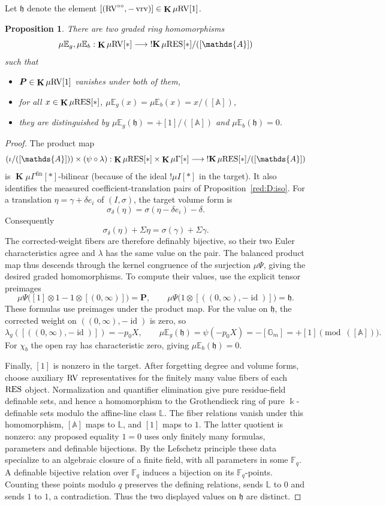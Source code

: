 \documentclass[12pt]{amsart}
\theoremstyle{plain}
\newtheorem{prop}[thm]{Proposition}
\theoremstyle{definition}
\theoremstyle{remark}
\numberwithin{equation}{section}
\theoremstyle{plain}
\newcommand{\RV}{\textup{RV}}
\DeclareMathOperator{\id}{id}
\DeclareMathOperator{\K}{\mathds{k}}
\newcommand{\A}{\mathds{A}}
\newcommand{\G}{\mathds{G}}
\newcommand{\gh}{\mathfrak{h}}
\newcommand{\0}{\emptyset}
\newcommand{\bb}[1]{\mathbb{#1}}
\newcommand{\fun}{\longrightarrow}
\newcommand{\mgRV}{{\mu}{\RV}}
\newcommand{\mG}{{\mu}{\Gamma}}
\newcommand{\RES}{\textup{RES}}
\newcommand{\mgRES}{{\mu}{\RES}}
\newcommand{\mgE}{{\mu}{\bb E}}
\DeclareMathOperator{\ggk}{\mathbf{K}}
\DeclareMathOperator{\sggk}{!\mathbf{K}}
\DeclareMathOperator{\fin}{fin}
\DeclareMathOperator{\vrv}{vrv}
\newcommand{\ccirc}{\circ \circ}
\begin{document}
Let $\gh$ denote the element $[(\RV^{\ccirc},  -\vrv)] \in \ggk \mgRV[1]$.

\begin{prop}\label{prop:eu:retr:k}
There are two graded ring homomorphisms
\[
  \mgE_{g}, \mgE_{b}: \ggk \mgRV[*] \fun   \sggk \mgRES[*] / ([\A])
\]
such that
\begin{itemize}
  \item $\bm P \in \ggk \mgRV[1]$ vanishes under both of them,
  \item for all $x \in \ggk \mgRES[*]$, $\mgE_{g}(x) = \mgE_{b}(x) = x/([\A])$,
  \item they are distinguished by $\mgE_{g}(\gh) = +[1]/([\A])$ and $\mgE_{b}(\gh) = 0$.
\end{itemize}
\end{prop}
\begin{proof}
The product map
\[
(\iota /([\A])) \times (\psi \circ \lambda) : \ggk \mgRES[*] \times  \ggk \mG[*] \fun    \sggk \mgRES[*] /([\A])
\]
is $\ggk \mG^{\fin}[*]$-bilinear (because of the ideal $!\mu I[*]$ in the target).
It also identifies the measured coefficient-translation pairs of Proposition~\ref{red:D:iso}. For a translation $\eta=\gamma+\delta e_i$ of $(I,\sigma)$, the target volume form is
\[
\sigma_\delta(\eta)=\sigma(\eta-\delta e_i)-\delta.
\]
Consequently
\[
\sigma_\delta(\eta)+\Sigma\eta=\sigma(\gamma)+\Sigma\gamma.
\]
The corrected-weight fibers are therefore definably bijective, so their two Euler characteristics agree and $\lambda$ has the same value on the pair. The balanced product map thus descends through the kernel congruence of the surjection ${\mu}\Psi$, giving the desired graded homomorphisms. To compute their values, use the explicit tensor preimages
\[
{\mu}\Psi\bigl([1]\otimes1-1\otimes[(0,\infty)]\bigr)=\bm P,
\qquad
{\mu}\Psi\bigl(1\otimes[((0,\infty),-\id)]\bigr)=\gh.
\]
These formulas use preimages under the product map.
For the value on $\gh$, the corrected weight on $((0,\infty),-\id)$ is zero, so
\[
\lambda_g([((0,\infty),-\id)])=-p_0X,
\qquad \mgE_g(\gh)=\psi(-p_0X)=-[\G_m]=+[1]\pmod{([\A])}.
\]
For $\chi_b$ the open ray has characteristic zero, giving $\mgE_b(\gh)=0$.

Finally, $[1]$ is nonzero in the target. After forgetting degree and volume forms, choose auxiliary $\RV$ representatives for the finitely many value fibers of each $\RES$ object. Normalization and quantifier elimination give pure residue-field definable sets, and hence a homomorphism to the Grothendieck ring of pure $\K$-definable sets modulo the affine-line class $\mathbb L$. The fiber relations vanish under this homomorphism, $[\A]$ maps to $\mathbb L$, and $[1]$ maps to $1$. The latter quotient is nonzero: any proposed equality $1=0$ uses only finitely many formulas, parameters and definable bijections. By the Lefschetz principle these data specialize to an algebraic closure of a finite field, with all parameters in some $\mathbb F_q$. A definable bijective relation over $\mathbb F_q$ induces a bijection on its $\mathbb F_q$-points. Counting these points modulo $q$ preserves the defining relations, sends $\mathbb L$ to $0$ and sends $1$ to $1$, a contradiction. Thus the two displayed values on $\gh$ are distinct.
\end{proof}
\end{document}

